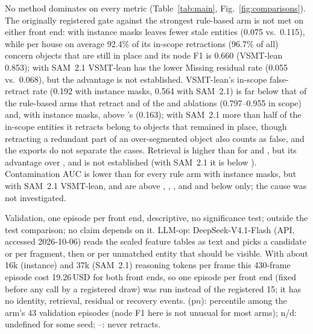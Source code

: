 No method dominates on every metric (Table~\ref{tab:main}, Fig.~\ref{fig:comparisons}).
The originally registered gate against the strongest rule-based arm is not met on either front end: with instance masks  leaves fewer stale entities (0.075 vs.\ 0.115), while per house on average 92.4\% of its in-scope retractions (96.7\% of all) concern objects that are still in place and its node F1 is 0.660 (VSMT-lean 0.853); with SAM~2.1 VSMT-lean has the lower Missing residual rate (0.055 vs.\ 0.068), but the advantage is not established.
VSMT-lean's in-scope false-retract rate (0.192 with instance masks, 0.564 with SAM~2.1) is far below that of the rule-based arms that retract and of the  and  ablations (0.797--0.955 in scope) and, with instance masks, above 's (0.163); with SAM~2.1 more than half of the in-scope entities it retracts belong to objects that remained in place, though retracting a redundant part of an over-segmented object also counts as false, and the exports do not separate the cases.
Retrieval is higher than for  and , but its advantage over ,  and  is not established (with SAM~2.1 it is below ).
Contamination AUC is lower than for every rule arm with instance masks, but with SAM~2.1 VSMT-lean,  and  are above , , ,  and  and below  only; the cause was not investigated.

\begin{table}[t]
\centering
\caption{LLM-op and the Other Arms on One Validation Episode}
\label{tab:llm_op}
\scriptsize
\setlength{\tabcolsep}{3.2pt}
\renewcommand{\arraystretch}{0.94}


\smallskip
\parbox{\columnwidth}{\scriptsize Validation, one episode per front end, descriptive, no significance test; outside the test comparison; no claim depends on it. LLM-op: DeepSeek-V4.1-Flash (API, accessed 2026-10-06) reads the sealed feature tables as text and picks a candidate or  per fragment, then  or  per unmatched entity that should be visible. With about 16k (instance) and 37k (SAM~2.1) reasoning tokens per frame this 430-frame episode cost 19.26\,USD for both front ends, so one episode per front end (fixed before any call by a registered draw) was run instead of the registered 15; it has no identity, retrieval, residual or recovery events. (p$n$): percentile among the arm's 43 validation episodes (node F1 here is not unusual for most arms); n/d: undefined for some seed; --: never retracts.}
\end{table}

